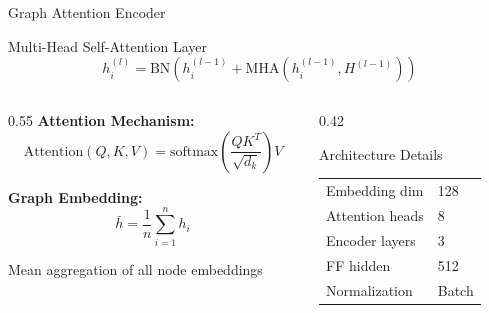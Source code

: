 \documentclass[aspectratio=169,11pt]{beamer}
\begin{document}
\begin{frame}{Graph Attention Encoder}
    \begin{block}{Multi-Head Self-Attention Layer}
        \[
        h_i^{(l)} = \text{BN}\left(h_i^{(l-1)} + \text{MHA}\left(h_i^{(l-1)}, H^{(l-1)}\right)\right)
        \]
    \end{block}
    
    \begin{columns}[T]
        \begin{column}{0.55\textwidth}
            \textbf{Attention Mechanism:}
            \[
            \text{Attention}(Q, K, V) = \text{softmax}\left(\frac{QK^T}{\sqrt{d_k}}\right)V
            \]
            
            \vspace{0.3cm}
            \textbf{Graph Embedding:}
            \[
            \bar{h} = \frac{1}{n}\sum_{i=1}^{n} h_i
            \]
            
            Mean aggregation of all node embeddings
        \end{column}
        \begin{column}{0.42\textwidth}
            \begin{block}{Architecture Details}
                \begin{tabular}{ll}
                    Embedding dim & 128 \\
                    Attention heads & 8 \\
                    Encoder layers & 3 \\
                    FF hidden & 512 \\
                    Normalization & Batch
                \end{tabular}
            \end{block}
        \end{column}
    \end{columns}
\end{frame}
\end{document}
